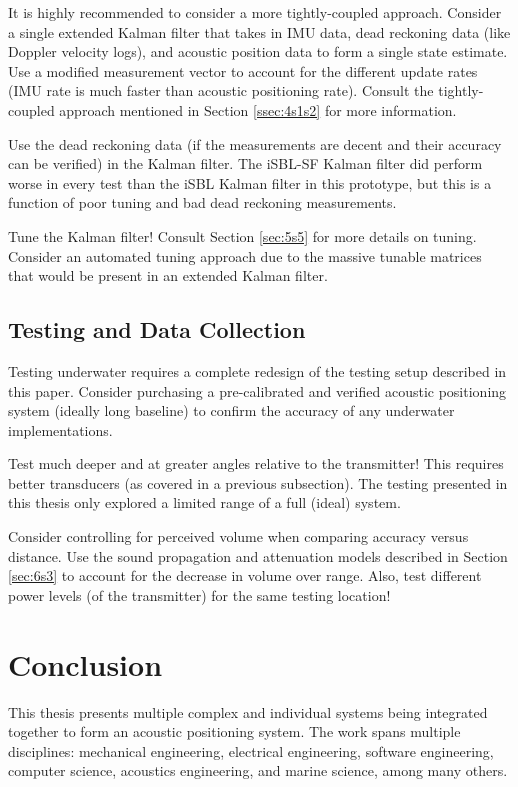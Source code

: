 \documentclass[11pt]{ucthesisCP}
\begin{document}
It is highly recommended to consider a more tightly-coupled approach. Consider a single extended Kalman filter that takes in IMU data, dead reckoning data (like Doppler velocity logs), and acoustic position data to form a single state estimate. Use a modified measurement vector to account for the different update rates (IMU rate is much faster than acoustic positioning rate). Consult the tightly-coupled approach mentioned in Section \ref{ssec:4s1s2} for more information.

Use the dead reckoning data (if the measurements are decent and their accuracy can be verified) in the Kalman filter. The iSBL-SF Kalman filter did perform worse in every test than the iSBL Kalman filter in this prototype, but this is a function of poor tuning and bad dead reckoning measurements.

Tune the Kalman filter! Consult Section \ref{sec:5s5} for more details on tuning. Consider an automated tuning approach due to the massive tunable matrices that would be present in an extended Kalman filter.

\subsection{Testing and Data Collection} \label{sec:7s1s7}
Testing underwater requires a complete redesign of the testing setup described in this paper. Consider purchasing a pre-calibrated and verified acoustic positioning system (ideally long baseline) to confirm the accuracy of any underwater implementations.

Test much deeper and at greater angles relative to the transmitter! This requires better transducers (as covered in a previous subsection). The testing presented in this thesis only explored a limited range of a full (ideal) system.

Consider controlling for perceived volume when comparing accuracy versus distance. Use the sound propagation and attenuation models described in Section \ref{sec:6s3} to account for the decrease in volume over range. Also, test different power levels (of the transmitter) for the same testing location!

\section{Conclusion} \label{sec:7s2}
This thesis presents multiple complex and individual systems being integrated together to form an acoustic positioning system. The work spans multiple disciplines: mechanical engineering, electrical engineering, software engineering, computer science, acoustics engineering, and marine science, among many others.
\end{document}
